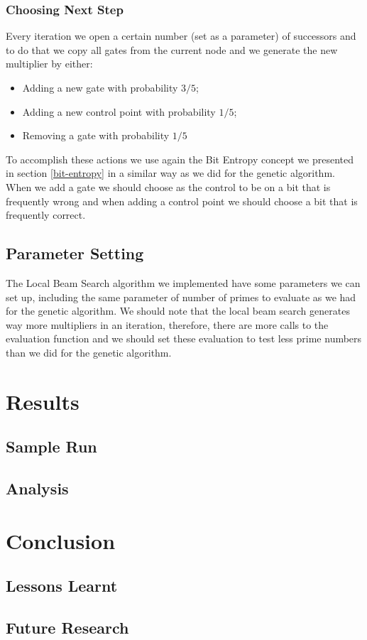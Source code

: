 \documentclass[12pt]{article}
\begin{document}
\subsubsection{Choosing Next Step}
Every iteration we open a certain number (set as a parameter) of successors and to do that we copy all gates from the current node and we generate the new multiplier by either:
\begin{itemize}
    \item{Adding a new gate with probability $3/5$;}
    \item{Adding a new control point with probability $1/5$;}
    \item{Removing a gate with probability $1/5$}
\end{itemize}

To accomplish these actions we use again the Bit Entropy concept we presented in section \ref{bit-entropy} in a similar way as we did for the genetic algorithm. When we add a gate we should choose as the control to be on a bit that is frequently wrong and when adding a control point we should choose a bit that is frequently correct.

\subsection{Parameter Setting}
The Local Beam Search algorithm we implemented have some parameters we can set up, including the same parameter of number of primes to evaluate as we had for the genetic algorithm. We should note that the local beam search generates way more multipliers in an iteration, therefore, there are more calls to the evaluation function and we should set these evaluation to test less prime numbers than we did for the genetic algorithm.

\section{Results}
\subsection{Sample Run}
\subsection{Analysis}


\section{Conclusion}
\subsection{Lessons Learnt}
\subsection{Future Research}
\end{document}
